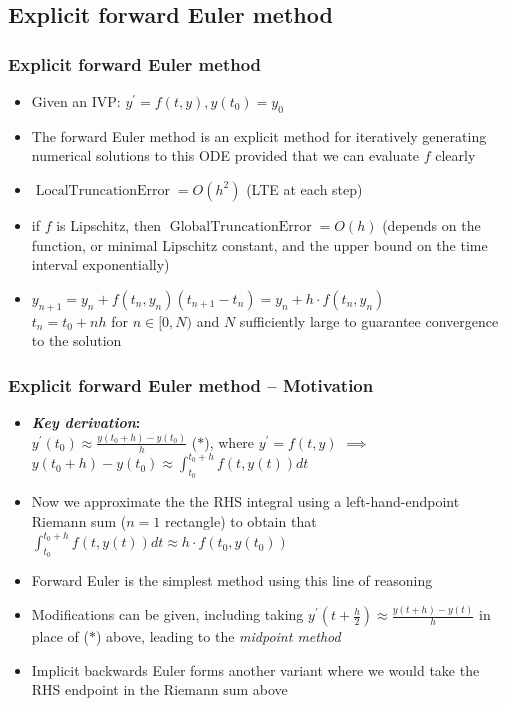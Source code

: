 \documentclass[usenames,svgnames,dvipsnames,10pt]{beamer}
\begin{document}
\subsection{Explicit forward Euler method}

\begin{frame}
\frametitle{Explicit forward Euler method}

\begin{itemize} 

\item Given an IVP: $y^{\prime} = f(t, y), y(t_0) = y_0$ 
\item The forward Euler method is an explicit method for iteratively 
      generating numerical solutions to this ODE provided that we can 
      evaluate $f$ clearly 
\item $\operatorname{LocalTruncationError} = O(h^2)$ (LTE at each step) 
\item if $f$ is Lipschitz, then $\operatorname{GlobalTruncationError} = O(h)$ 
       (depends on the function, or minimal Lipschitz constant, and the upper bound on the 
       time interval exponentially) 
\item $y_{n+1} = y_n + f(t_n, y_n) \left(t_{n+1} - t_n\right) = y_n + h \cdot f(t_n, y_n)$ \\ 
      $t_n = t_0 + nh$ for $n \in [0, N)$ and $N$ sufficiently large to guarantee convergence 
      to the solution 

\end{itemize} 

\end{frame}

\begin{frame}
\frametitle{Explicit forward Euler method -- Motivation}

\begin{itemize} 

\item \textbf{\emph{Key derivation}:} \\ 
      $y^{\prime}(t_0) \approx \frac{y(t_0+h)-y(t_0)}{h}$ ($\ast$), where 
      $y^{\prime} = f(t, y)$ $\implies$ $y(t_0+h)-y(t_0) \approx \int_{t_0}^{t_0+h} f(t, y(t)) dt$ 
\item Now we approximate the the RHS integral using a left-hand-endpoint Riemann sum ($n=1$ rectangle) to 
      obtain that $\int_{t_0}^{t_0+h} f(t, y(t)) dt \approx h \cdot f(t_0, y(t_0))$
\item Forward Euler is the simplest method using this line of reasoning 
\item Modifications can be given, including 
      taking $y^{\prime}\left(t + \frac{h}{2}\right) \approx \frac{y(t+h)-y(t)}{h}$ in place of ($\ast$) above, 
      leading to the \emph{midpoint method} 
\item Implicit backwards Euler forms another variant where we would take the RHS endpoint in the Riemann sum above

\end{itemize} 

\end{frame}
\end{document}
